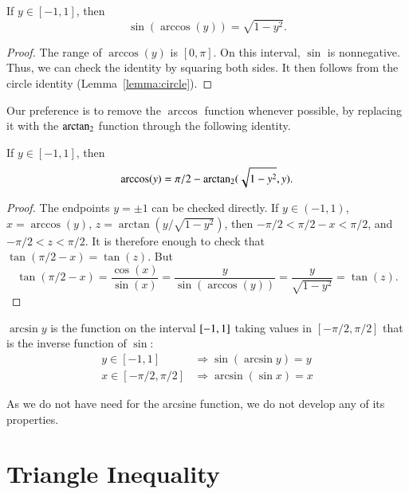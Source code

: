 \begin{lemma}\label{lemma:sin-arccos} If $y\in[-1,1]$, then
    $$\sin(\arccos(y)) = \sqrt{1-y^2}.$$
\end{lemma}

\begin{proof}
    The range of $\arccos(y)$ is $[0,\pi]$.  On this interval, $\sin$
    is nonnegative.  Thus, we can check the identity by squaring
    both sides.  It then follows from the circle identity
    (Lemma~\ref{lemma:circle}).
\end{proof}


Our preference is to remove the $\arccos$ function whenever
possible, by replacing it with the ${\operatorname{arctan_2}}$ function through the
following identity.  

\begin{lemma}\label{lemma:arccos-arctan}  If $y\in [-1,1]$, then
    $$\arccos(y) = \pi/2 - {\operatorname{arctan_2}}({ \sqrt{1-y^2}},{y}).$$
\end{lemma}

\begin{proof} The endpoints $y=\pm1$ can be checked directly.
If $y\in (-1,1)$,  $x = \arccos(y)$, 
$z = \arctan(y/\sqrt{1-y^2})$, then
    $-\pi/2 < \pi/2 - x < \pi/2$, and $-\pi/2 < z < \pi/2$.  It is
    therefore enough to check that
        $\tan(\pi/2 - x) = \tan(z)$.
    But
        $$\tan(\pi/2-x) = \frac{\cos(x)}{\sin(x)} = \frac{y}{
        \sin(\arccos(y))} = \frac{y}{ \sqrt{1-y^2}} = \tan(z).$$
\end{proof}

\begin{definition}\label{def:arcsin}
$\arcsin y$ is the function on the interval $[
-1,1]$ taking values in $[-\pi/2,\pi/2]$ that is the
inverse function of $\sin$:
    $$\begin{array}{lll}
        y\in [-1,1] &\Rightarrow \sin(\arcsin y) = y\\
        x\in[-\pi/2,\pi/2] &\Rightarrow \arcsin(\sin x) = x
    \end{array}$$
\end{definition}

As we do not have need for the arcsine function, we do not develop
any of its properties.





\section{Triangle Inequality}

